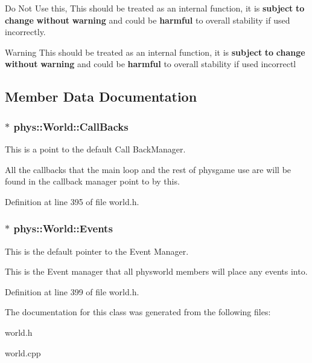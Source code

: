 Do Not Use this, This should be treated as an internal function, it is {\bfseries subject} {\bfseries to} {\bfseries change} {\bfseries without} {\bfseries warning} and could be {\bfseries harmful} to overall stability if used incorrectly. 

\begin{DoxyWarning}{Warning}
This should be treated as an internal function, it is {\bfseries subject} {\bfseries to} {\bfseries change} {\bfseries without} {\bfseries warning} and could be {\bfseries harmful} to overall stability if used incorrectl 
\end{DoxyWarning}


\subsection{Member Data Documentation}
\hypertarget{classphys_1_1World_a22a1624c63198f49fdf8e448881bdb2e}{
\subsubsection[{CallBacks}]{$\ast$ {\bf phys::World::CallBacks}}}
\label{da/ddf/classphys_1_1World_a22a1624c63198f49fdf8e448881bdb2e}


This is a point to the default Call BackManager. 

All the callbacks that the main loop and the rest of physgame use are will be found in the callback manager point to by this. 

Definition at line 395 of file world.h.

\hypertarget{classphys_1_1World_ad0b13f1f3caf0342f56671b522543453}{
\subsubsection[{Events}]{$\ast$ {\bf phys::World::Events}}}
\label{da/ddf/classphys_1_1World_ad0b13f1f3caf0342f56671b522543453}


This is the default pointer to the Event Manager. 

This is the Event manager that all physworld members will place any events into. 

Definition at line 399 of file world.h.



The documentation for this class was generated from the following files:\begin{DoxyCompactItemize}
\item 
world.h\item 
world.cpp\end{DoxyCompactItemize}
